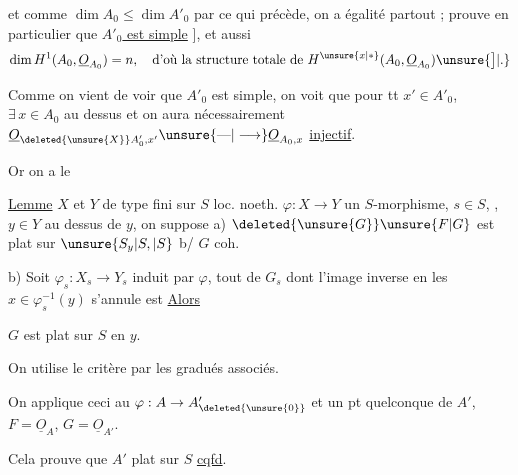 et comme $\dim A_0\leq\dim A'_0$ par ce qui précède, on a égalité partout ;  prouve en particulier que \uline{$A'_0$ est simple} ], et aussi
\[
\dim H^{1}(A_0,\underline O_{A_0})=n,\quad\text{d'où la structure totale de }H^{\unsure{x|*}}(A_0,\underline O_{A_0})\unsure{\big]|.}
\]

Comme on vient de voir que $A'_0$ est simple, on voit que pour tt $x'\in A'_0$, $\exists\,x\in A_0$ au dessus et on aura nécessairement $\underline O_{\deleted{\unsure{X}}A'_0,x'}\unsure{\text{---}|\longrightarrow}\underline O_{A_0,x}$ \uline{injectif}.

Or on a le

\uline{Lemme} $X$ et $Y$ de type fini sur $S$ loc. noeth.  $\varphi:X\to Y$ un $S$-morphisme, $s\in S$, ,  $y\in Y$ au dessus de $y$, on suppose a) $\deleted{\unsure{G}} \unsure{F|G}$ est plat sur $\unsure{S_y|S,|S}$ b/ $G$ coh.


b) Soit $\varphi_s:X_s\to Y_s$ induit par $\varphi$,  tout  de $G_s$ dont l'image inverse en les $x\in\varphi_s^{-1}(y)$ s'annule est   \uline{Alors}

$G$ est plat sur $S$ en $y$.

On utilise le critère par les gradués associés.

On applique ceci au $\varphi:A\to A_{\deleted{\unsure{0}}}'$ et un pt quelconque de $A'$, $F=\underline O_A$, $G=\underline O_{A'}$.

Cela prouve que $A'$  plat sur $S$ \uline{cqfd}.

